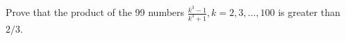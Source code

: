 Prove that the product of the 99 numbers $ \frac{k^3-1}{k^3+1},k=2,3,\ldots,100$ is greater than $ 2/3$.